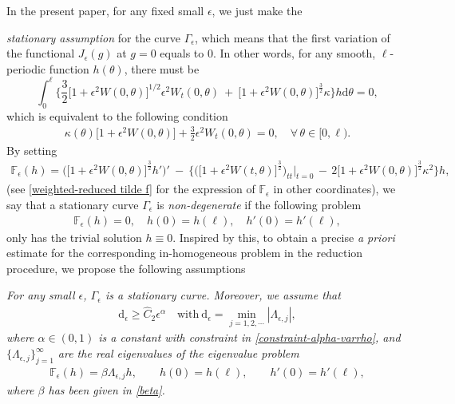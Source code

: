 \documentclass[10pt, reqno]{amsart}
\numberwithin{equation}{section}
\theoremstyle{definition}
\begin{document}
In the present paper, for any fixed small $\epsilon$, we just make the {\emph {stationary assumption} for the curve $\Gamma_\epsilon$, which means that the first variation of the functional $J_\epsilon (g)$ at $g=0$ equals to $0$.
In other words, for any smooth, $\ell$-periodic function $h(\theta)$, there must be
\[
\displaystyle\int_0^{\ell} \Bigg\{ \frac 3 2\big[1+ \epsilon^2 W(0, \theta) \big]^{1/2}\epsilon^2 W_t(0, \theta)
\ +\
\big[1+ \epsilon^2 W(0, \theta) \big]^{\frac 3 2} \kappa \Bigg\} h{\mathrm d} \theta =0,
\]
which is equivalent to the following condition
\begin{align} \label{stationary assumption}
\kappa(\theta) \big[1+ \epsilon^2 W(0, \theta) \big] + \frac 3 2 \epsilon^2 W_t(0, \theta) = 0,
\quad\forall\, \theta\in [0, \ell).
\end{align}
By setting
\begin{align}
\mathbb{F}_\epsilon(h)
=
\Big(\big[1+ \epsilon^2 W(0, \theta) \big]^{\frac32}h' \Big)'
\ -\
\Bigg\{ \Big( \big[1+ \epsilon^2 W(t, \theta) \big]^{\frac32} \Big)_{tt}\Big|_{t=0}
\,-\, 2 \big[1+ \epsilon^2 W(0, \theta) \big]^{\frac32} \kappa^2 \Bigg\} h,
\label{mathbbF}
\end{align}
(see \eqref{weighted-reduced tilde f} for the expression of $\mathbb{F}_\epsilon$ in other coordinates),
we say that a stationary curve $\Gamma_\epsilon$ is {\emph {non-degenerate}} if
the following problem
\begin{align}
\mathbb{F}_\epsilon(h)=0,
\quad
h(0) = h(\ell), \quad h'(0) = h'(\ell),
\label{nondeneracy}
\end{align}
only has the trivial solution $h\equiv 0$.
Inspired by this, to obtain a precise {\em a priori} estimate for the corresponding in-homogeneous problem in the reduction procedure, we propose the following assumptions

\smallskip\noindent {\bf{(B1).}}
{\it{
For any small $\epsilon$, $\Gamma_\epsilon$ is a stationary curve.
Moreover, we assume that
\smallskip
\begin{align}\label{resonace-f}
{\mathrm d}_\epsilon \geq \hat{C}_2 \epsilon^{\alpha}
\quad \text{with}\ {\mathrm d}_\epsilon = \min_{j=1,2,\cdots} |\Lambda_{\epsilon, j}|,
\end{align}
where $\alpha\in(0, 1)$ is a constant with constraint in \eqref{constraint-alpha-varrho}, and $\{\Lambda_{\epsilon, j}\} _{j=1}^\infty$ are the real eigenvalues of the eigenvalue problem
\begin{align}
\mathbb{F}_\epsilon(h) =\beta\Lambda_{\epsilon, j}h,
\qquad
h(0) = h(\ell), \qquad h'(0) = h'(\ell),
\label{mathbbF-boundary}
\end{align}
where $\beta$ has been given in \eqref{beta}.
}}









}
\end{document}
